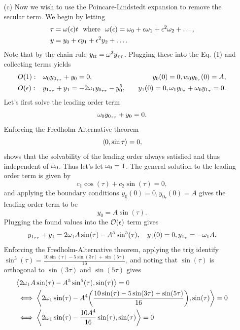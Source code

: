 \documentclass[12pt]{report}
\begin{document}
\begin{solution}
\begin{enumerate}
        \item [(c)]
        Now we wish to use the Poincare-Lindstedt expansion to remove the secular term. We begin by letting
        \begin{align*}
            \tau &= \omega({\epsilon})t ~~\text{where}~~\omega({\epsilon}) = \omega_0 + {\epsilon}\omega_1 + {\epsilon}^2\omega_2 + \dots,\\
            y &= y_0 + {\epsilon} y_1 + {\epsilon}^2y_2 + \dots.
        \end{align*} 
        Note that by the chain rule $y_{tt} = \omega^2 y_{\tau \tau}$. Plugging these into the Eq. (1) and collecting terms yields
        \begin{align*}
            &O(1): &&\omega_0 y_{0_{\tau \tau}} + y_0 = 0, &&&y_0(0) = 0, w_0y_{0_\tau}(0)=A,\\
            &O({\epsilon}): && y_{1_{\tau \tau}} + y_1 = -2\omega_1y_{0_{\tau \tau}} -  y_0^5, &&&y_1(0) = 0, \omega_1y_{0_\tau} + \omega_0 y_{1_\tau} = 0.\\
        \end{align*}
        Let's first solve the leading order term
        \[ 
            \omega_0 y_{0_{\tau \tau}} + y_0 = 0.
        \]
        Enforcing the Fredholm-Alternative theorem
        \[ 
            {\left\langle0,\sin\tau\right\rangle}=0,
        \]
        shows that the solvability of the leading order always satisfied and thus independent of $\omega_0$. Thus let's let $\omega_0 = 1$. The general solution to the leading order term is given by
        \[ 
            c_1\cos(\tau) + c_2\sin(\tau) = 0,
        \] 
        and applying the boundary conditions $y_0(0) = 0, y_{0_\tau}(0)=A$ gives the leading order term to be
        \[ 
            y_0 = A\sin(\tau).
        \]
        Plugging the found values into the ${\mathcal{O}}({\epsilon})$ term gives 
        \[ 
            y_{1_{\tau \tau}} + y_1 = 2\omega_1A\sin(\tau) - A^5 \sin^5(\tau), ~~~ y_1(0) = 0,  y_{1_\tau} = -\omega_1A.
        \]
        Enforcing the Fredholm-Alternative theorem, applying the trig identify $\sin^5(\tau) = \frac{10\sin(\tau) - 5\sin(3\tau) + \sin(5\tau)}{16}$, and noting that $\sin(\tau)$ is orthogonal to $\sin(3\tau)$ and $\sin(5\tau)$ gives 
        \begin{align*}
            &\abrac{2\w_1A\sin(\tau) - A^5 \sin^5(\tau),\sin(\tau)} = 0\\
            &\iff \abrac{2\w_1\sin(\tau) - A^4 \paren{\frac{10\sin(\tau) - 5\sin(3\tau) + \sin(5\tau)}{16}},\sin(\tau)} = 0\\
            &\iff \abrac{2\w_1\sin(\tau) - \frac{10A^4}{16}\sin(\tau),\sin(\tau)} = 0\\

\end{align*}
\end{enumerate}
\end{solution}
\end{document}

